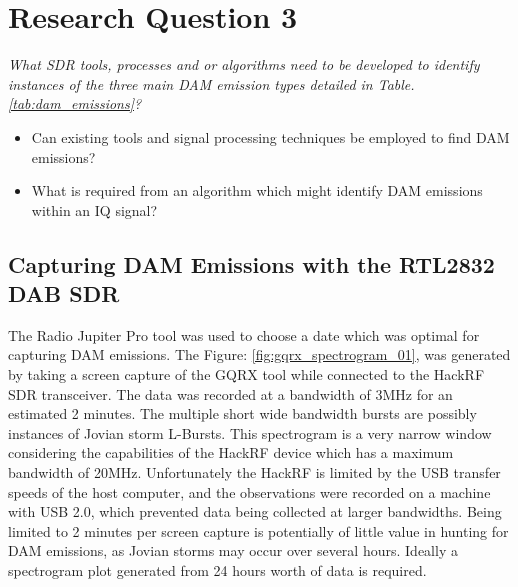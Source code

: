 \documentclass[runningheads,a4paper]{llncs}
\begin{document}
\chapter*{Research Question 3}


\textit{What \gls{SDR} tools, processes and or algorithms need to be developed to identify instances of the three main \gls{DAM} emission types detailed in Table. \ref{tab:dam_emissions}?}

\begin{itemize}
	\item Can existing tools and signal processing techniques be employed to find \gls{DAM} emissions?
	\item What is required from an algorithm which might identify \gls{DAM} emissions within an \gls{IQ} signal?
\end{itemize}

\section*{Capturing DAM Emissions with the RTL2832 DAB SDR}

The Radio Jupiter Pro tool was used to choose a date which was optimal for capturing \gls{DAM} emissions. The Figure: \ref{fig:gqrx_spectrogram_01}, was generated by taking a screen capture of the GQRX tool while connected to the HackRF \gls{SDR} transceiver. The data was recorded at a bandwidth of 3MHz for an estimated 2 minutes. The multiple short wide bandwidth bursts are possibly instances of Jovian storm L-Bursts. This spectrogram is a very narrow window considering the capabilities of the HackRF device which has a maximum bandwidth of 20MHz. Unfortunately the HackRF is limited by the USB transfer speeds of the host computer, and the observations were recorded on a machine with USB 2.0, which prevented data being collected at larger bandwidths. Being limited to 2 minutes per screen capture is potentially of little value in hunting for \gls{DAM} emissions, as Jovian storms may occur over several hours. Ideally a spectrogram plot generated from 24 hours worth of data is required.
\end{document}

